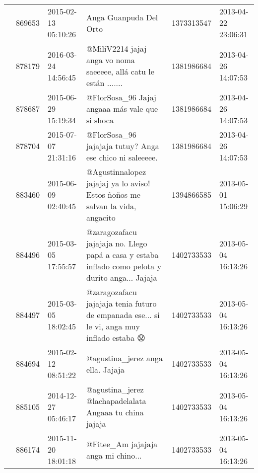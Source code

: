 \begin{tabular}{llllrl}
           & 869653  & 2015-02-13 05:10:26 &                                                                                                                       Anga Guanpuda Del Orto &  1373313547 & 2013-04-22 23:06:31 \\
           & 878179  & 2016-03-24 14:56:45 &                                                                            @MiliV2214 jajaj anga vo noma saeeeee, allá catu le están ....... &  1381986684 & 2013-04-26 14:07:53 \\
           & 878687  & 2015-06-29 15:19:34 &                                                                                              @FlorSosa\_96 Jajaj angaaa más vale que si shoca &  1381986684 & 2013-04-26 14:07:53 \\
           & 878704  & 2015-07-07 21:31:16 &                                                                                     @FlorSosa\_96 jajajaja tutuy? Anga ese chico ni saleeeee. &  1381986684 & 2013-04-26 14:07:53 \\
           & 883460  & 2015-06-09 02:40:45 &                                                                 @Agustinnalopez jajajaj ya lo aviso! Estos ñoños me salvan la vida, angacito &  1394866585 & 2013-05-01 15:06:29 \\
           & 884496  & 2015-03-05 17:55:57 &                                            @zaragozafacu jajajaja no. Llego papá a casa y estaba inflado como pelota y durito anga... Jajaja &  1402733533 & 2013-05-04 16:13:26 \\
           & 884497  & 2015-03-05 18:02:45 &                                                   @zaragozafacu jajajaja tenia futuro de empanada ese... si le vi, anga muy inflado estaba 😟 &  1402733533 & 2013-05-04 16:13:26 \\
           & 884694  & 2015-02-12 08:51:22 &                                                                                                          @agustina\_jerez anga ella.   Jajaja &  1402733533 & 2013-05-04 16:13:26 \\
           & 885105  & 2014-12-27 05:46:17 &                                                                                      @agustina\_jerez @lachapadelalata Angaaa tu china jajaja &  1402733533 & 2013-05-04 16:13:26 \\
           & 886174  & 2015-11-20 18:01:18 &                                                                                                          @Fitee\_Am jajajaja anga mi chino... &  1402733533 & 2013-05-04 16:13:26 \\

\end{tabular}
